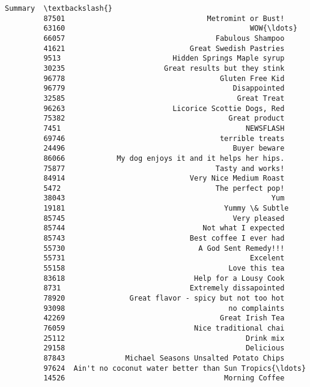 \documentclass[11pt]{article}
\begin{document}
\begin{Verbatim}[commandchars=\\\{\}]
                                                          Summary  \textbackslash{}
         87501                                 Metromint or Bust!   
         63160                                           WOW{\ldots}   
         66057                                   Fabulous Shampoo   
         41621                             Great Swedish Pastries   
         9513                          Hidden Springs Maple syrup   
         30235                       Great results but they stink   
         96778                                    Gluten Free Kid   
         96779                                       Disappointed   
         32585                                        Great Treat   
         96263                         Licorice Scottie Dogs, Red   
         75382                                      Great product   
         7451                                           NEWSFLASH   
         69746                                    terrible treats   
         24496                                       Buyer beware   
         86066            My dog enjoys it and it helps her hips.   
         75877                                   Tasty and works!   
         84914                             Very Nice Medium Roast   
         5472                                    The perfect pop!   
         38043                                                Yum   
         19181                                     Yummy \& Subtle   
         85745                                       Very pleased   
         85744                                Not what I expected   
         85743                             Best coffee I ever had   
         55730                               A God Sent Remedy!!!   
         55731                                           Excelent   
         55158                                      Love this tea   
         83618                              Help for a Lousy Cook   
         8731                              Extremely dissapointed   
         78920               Great flavor - spicy but not too hot   
         93098                                      no complaints   
         42269                                    Great Irish Tea   
         76059                              Nice traditional chai   
         25112                                          Drink mix   
         29158                                          Delicious   
         87843              Michael Seasons Unsalted Potato Chips   
         97624  Ain't no coconut water better than Sun Tropics{\ldots}   
         14526                                     Morning Coffee   

\end{Verbatim}
\end{document}
